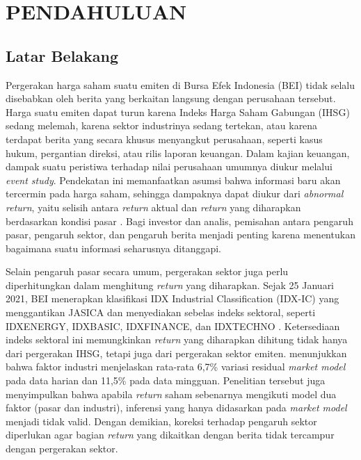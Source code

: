 \cleardoublepage
\chapter{PENDAHULUAN}
\label{chap:pendahuluan}

\section{Latar Belakang}

Pergerakan harga saham suatu emiten di Bursa Efek Indonesia (BEI) tidak selalu disebabkan oleh berita yang berkaitan langsung dengan perusahaan tersebut. Harga suatu emiten dapat turun karena Indeks Harga Saham Gabungan (IHSG) sedang melemah, karena sektor industrinya sedang tertekan, atau karena terdapat berita yang secara khusus menyangkut perusahaan, seperti kasus hukum, pergantian direksi, atau rilis laporan keuangan. Dalam kajian keuangan, dampak suatu peristiwa terhadap nilai perusahaan umumnya diukur melalui \emph{event study}. Pendekatan ini memanfaatkan asumsi bahwa informasi baru akan tercermin pada harga saham, sehingga dampaknya dapat diukur dari \emph{abnormal return}, yaitu selisih antara \emph{return} aktual dan \emph{return} yang diharapkan berdasarkan kondisi pasar \autocite{mackinlay1997,brown1985}. Bagi investor dan analis, pemisahan antara pengaruh pasar, pengaruh sektor, dan pengaruh berita menjadi penting karena menentukan bagaimana suatu informasi seharusnya ditanggapi.

Selain pengaruh pasar secara umum, pergerakan sektor juga perlu diperhitungkan dalam menghitung \emph{return} yang diharapkan. Sejak 25 Januari 2021, BEI menerapkan klasifikasi IDX Industrial Classification (IDX-IC) yang menggantikan JASICA dan menyediakan sebelas indeks sektoral, seperti IDXENERGY, IDXBASIC, IDXFINANCE, dan IDXTECHNO \autocite{cnbc2021idxic}. Ketersediaan indeks sektoral ini memungkinkan \emph{return} yang diharapkan dihitung tidak hanya dari pergerakan IHSG, tetapi juga dari pergerakan sektor emiten. \textcite{xiang1993} menunjukkan bahwa faktor industri menjelaskan rata-rata 6,7\% variasi residual \emph{market model} pada data harian dan 11,5\% pada data mingguan. Penelitian tersebut juga menyimpulkan bahwa apabila \emph{return} saham sebenarnya mengikuti model dua faktor (pasar dan industri), inferensi yang hanya didasarkan pada \emph{market model} menjadi tidak valid. Dengan demikian, koreksi terhadap pengaruh sektor diperlukan agar bagian \emph{return} yang dikaitkan dengan berita tidak tercampur dengan pergerakan sektor.

